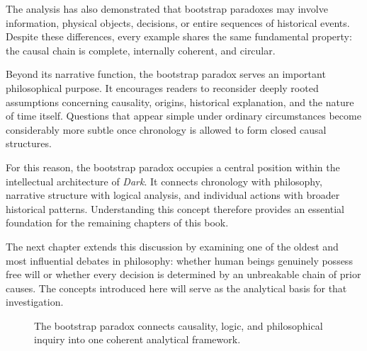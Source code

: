 \documentclass[12pt,oneside,openany]{book}
\begin{document}
The analysis has also demonstrated that bootstrap paradoxes may involve
information, physical objects, decisions, or entire sequences of historical
events. Despite these differences, every example shares the same fundamental
property: the causal chain is complete, internally coherent, and circular.

Beyond its narrative function, the bootstrap paradox serves an important
philosophical purpose. It encourages readers to reconsider deeply rooted
assumptions concerning causality, origins, historical explanation, and the
nature of time itself. Questions that appear simple under ordinary
circumstances become considerably more subtle once chronology is allowed to
form closed causal structures.

For this reason, the bootstrap paradox occupies a central position within the
intellectual architecture of \textit{Dark}. It connects chronology with
philosophy, narrative structure with logical analysis, and individual actions
with broader historical patterns. Understanding this concept therefore provides
an essential foundation for the remaining chapters of this book.

The next chapter extends this discussion by examining one of the oldest and
most influential debates in philosophy: whether human beings genuinely possess
free will or whether every decision is determined by an unbreakable chain of
prior causes. The concepts introduced here will serve as the analytical basis
for that investigation.

\begin{figure}[H]
\centering
{}
\caption{The bootstrap paradox connects causality, logic, and philosophical inquiry into one coherent analytical framework.}
\end{figure}
\end{document}
